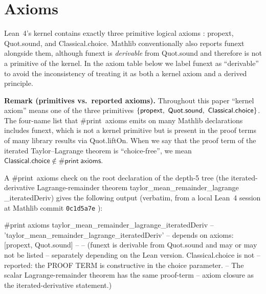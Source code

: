 \documentclass[11pt,reqno]{amsart}
\begin{document}
\section{Axioms}

\label{sec:axioms}

\noindent Lean~4's kernel contains exactly three primitive logical axioms 
\cite{mathlib4, mathlib4-docs}: \textsf{propext}, \textsf{%
Quot\allowbreak.sound}, and \textsf{Classical\allowbreak.choice}. Mathlib
conventionally also reports \textsf{funext} alongside them, although \textsf{%
funext} is \emph{derivable} from \textsf{Quot\allowbreak.sound} and
therefore is not a primitive of the kernel. In the axiom table below we
label \textsf{funext} as ``derivable'' to avoid the inconsistency of
treating it as both a kernel axiom and a derived principle.

\noindent\textbf{Remark (primitives vs.\ reported axioms).} Throughout this
paper ``kernel axiom'' means one of the three primitives $\{\mathsf{propext}%
,\allowbreak\ \mathsf{Quot\allowbreak.sound},\allowbreak\ \mathsf{%
Classical\allowbreak.choice}\}$. The four-name list that \textsf{\#print\
axioms} emits on many Mathlib declarations includes \textsf{funext}, which
is not a kernel primitive but is present in the proof terms of many library
results via \textsf{Quot\allowbreak.liftOn}. When we say that the proof term
of the iterated Taylor--Lagrange theorem is ``choice-free'', we mean $%
\mathsf{Classical\allowbreak.choice}\notin \mathsf{\#print\ axioms}$.

A \textsf{\#print\ axioms} check on the root declaration of the depth-5 tree
(the iterated-derivative Lagrange-remainder theorem \textsf{%
taylor\allowbreak\_mean\allowbreak\_remainder\allowbreak\_lagrange%
\allowbreak \_iterated\allowbreak Deriv}) gives the following output
(verbatim, from a local Lean~4 session at Mathlib commit \texttt{0c1d5a7e}%
{}):

\text{ \ } \text{ \ } 
\begin{verbatimbox}
#print axioms
  taylor_mean_remainder_lagrange_iteratedDeriv
-- 'taylor_mean_remainder_lagrange_iteratedDeriv'
--   depends on axioms: [propext, Quot.sound]
--
-- (funext is derivable from Quot.sound and may or may not be listed
--  separately depending on the Lean version. Classical.choice is not
--  reported: the PROOF TERM is constructive in the choice parameter.
--  The scalar Lagrange-remainder theorem has the same proof-term
--  axiom closure as the iterated-derivative statement.)
\end{verbatimbox}
\text{ \ } \text{ \ }
\end{document}
